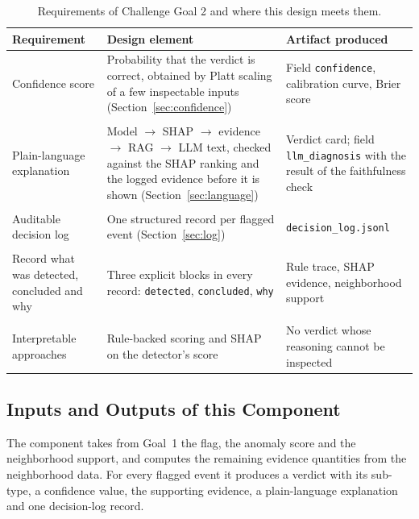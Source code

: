 \documentclass[11pt,a4paper]{article}
\begin{document}
\begin{table}[H]
\centering
\small
\begin{tabularx}{\textwidth}{@{}>{\raggedright\arraybackslash}p{3.4cm}LL@{}}
\toprule
\textbf{Requirement} & \textbf{Design element} & \textbf{Artifact produced} \\
\midrule
Confidence score & Probability that the verdict is correct, obtained by Platt scaling of a few inspectable inputs (Section~\ref{sec:confidence}) & Field \texttt{confidence}, calibration curve, Brier score \\ \\
Plain-language explanation & Model $\rightarrow$ SHAP $\rightarrow$ evidence $\rightarrow$ RAG $\rightarrow$ LLM text, checked against the SHAP ranking and the logged evidence before it is shown (Section~\ref{sec:language}) & Verdict card; field \texttt{llm\_diagnosis} with the result of the faithfulness check \\ \\
Auditable decision log & One structured record per flagged event (Section~\ref{sec:log}) & \texttt{decision\_log.jsonl} \\ \\
Record what was detected, concluded and why & Three explicit blocks in every record: \texttt{detected}, \texttt{concluded}, \texttt{why} & Rule trace, SHAP evidence, neighborhood support \\ \\
Interpretable approaches & Rule-backed scoring and SHAP on the detector's score & No verdict whose reasoning cannot be inspected \\
\bottomrule
\end{tabularx}
\caption{Requirements of Challenge Goal 2 and where this design meets them.}
\label{tab:requirements}
\end{table}

\subsection{Inputs and Outputs of this Component}
The component takes from Goal~1 the flag, the anomaly score and the neighborhood support, and computes the
remaining evidence quantities from the neighborhood data. For every flagged event it produces a verdict
with its sub-type, a confidence value, the supporting evidence, a plain-language explanation and one
decision-log record.
\end{document}
